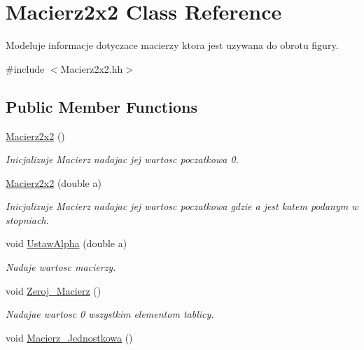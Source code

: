\hypertarget{class_macierz2x2}{\section{Macierz2x2 Class Reference}
\label{class_macierz2x2}
}


Modeluje informacje dotyczace macierzy ktora jest uzywana do obrotu figury.  




{\ttfamily \#include $<$Macierz2x2.\+hh$>$}

\subsection*{Public Member Functions}
\begin{DoxyCompactItemize}
\item 
\hypertarget{class_macierz2x2_acbcea1b811870ddce0e439b2837a1a49}{\hyperlink{class_macierz2x2_acbcea1b811870ddce0e439b2837a1a49}{Macierz2x2} ()}\label{class_macierz2x2_acbcea1b811870ddce0e439b2837a1a49}

\begin{DoxyCompactList}\small\item\em Inicjalizuje Macierz nadajac jej wartosc poczatkowa 0. \end{DoxyCompactList}\item 
\hypertarget{class_macierz2x2_a12899c38f29c0f7955e1fa647b3f86e4}{\hyperlink{class_macierz2x2_a12899c38f29c0f7955e1fa647b3f86e4}{Macierz2x2} (double a)}\label{class_macierz2x2_a12899c38f29c0f7955e1fa647b3f86e4}

\begin{DoxyCompactList}\small\item\em Inicjalizuje Macierz nadajac jej wartosc poczatkowa gdzie a jest katem podanym w stopniach. \end{DoxyCompactList}\item 
void \hyperlink{class_macierz2x2_ab4715f3bb1c13c7642c98ac52a694de9}{Ustaw\+Alpha} (double a)
\begin{DoxyCompactList}\small\item\em Nadaje wartosc macierzy. \end{DoxyCompactList}\item 
\hypertarget{class_macierz2x2_ab114157191def4f1362c2b3b134dbcad}{void \hyperlink{class_macierz2x2_ab114157191def4f1362c2b3b134dbcad}{Zeroj\+\_\+\+Macierz} ()}\label{class_macierz2x2_ab114157191def4f1362c2b3b134dbcad}

\begin{DoxyCompactList}\small\item\em Nadajae wartosc 0 wszystkim elementom tablicy. \end{DoxyCompactList}\item 
\hypertarget{class_macierz2x2_ad2ced5de1710bdf88fb869853bcce2fc}{void \hyperlink{class_macierz2x2_ad2ced5de1710bdf88fb869853bcce2fc}{Macierz\+\_\+\+Jednostkowa} ()}\label{class_macierz2x2_ad2ced5de1710bdf88fb869853bcce2fc}


\end{DoxyCompactItemize}
